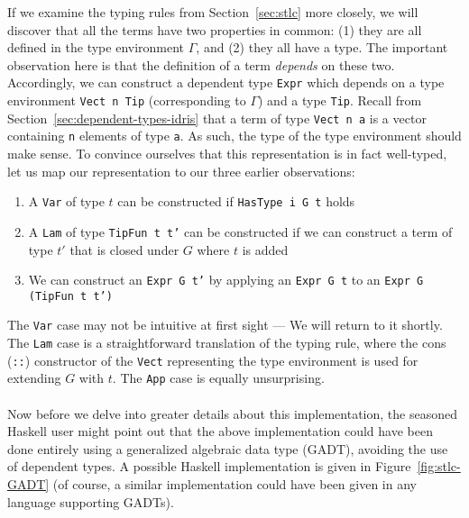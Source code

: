 If we examine the typing rules from Section~\ref{sec:stlc} more closely, we will discover that all the terms have two properties in common: (1) they are all defined in the type environment $\Gamma$, and (2) they all have a type. The important observation here is that the definition of a term \emph{depends} on these two. Accordingly, we can construct a dependent type \texttt{Expr} which depends on a type environment \texttt{Vect n Tip} (corresponding to $\Gamma$) and a type \texttt{Tip}. Recall from Section~\ref{sec:dependent-types-idris} that a term of type \texttt{Vect n a} is a vector containing \texttt{n} elements of type \texttt{a}. As such, the type of the type environment should make sense. To convince ourselves that this representation is in fact well-typed, let us map our representation to our three earlier observations:

\begin{enumerate}
\item A \texttt{Var} of type $t$ can be constructed if \texttt{HasType i G t} holds
\item A \texttt{Lam} of type \texttt{TipFun t t'} can be constructed if we can construct a term of type $t'$ that is closed under $G$ where $t$ is added
\item We can construct an \texttt{Expr G t'} by applying an \texttt{Expr G t} to an \texttt{Expr G (TipFun t t')}
\end{enumerate}

The \texttt{Var} case may not be intuitive at first sight --- We will return to it shortly. The \texttt{Lam} case is a straightforward translation of the typing rule, where the cons (\texttt{::}) constructor of the \texttt{Vect} representing the type environment is used for extending $G$ with $t$. The \texttt{App} case is equally unsurprising.

\paragraph{}
Now before we delve into greater details about this implementation, the seasoned Haskell user might point out that the above implementation could have been done entirely using a generalized algebraic data type (GADT), avoiding the use of dependent types. A possible Haskell implementation is given in Figure~\ref{fig:stlc-GADT} (of course, a similar implementation could have been given in any language supporting GADTs).

